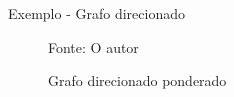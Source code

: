 \begin{frame}{Exemplo - Grafo direcionado}
    \begin{figure}[htbp]
        \centering
        
        \caption[Grafo Direcionado Ponderado]{Grafo direcionado ponderado}
        \small{Fonte: O autor}
        \label{fig:Grafo2}
    \end{figure}
\end{frame}